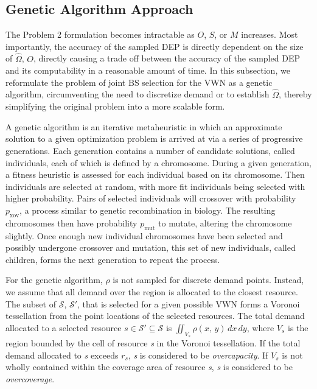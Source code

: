 \documentclass[conference]{IEEEtran}
\begin{document}
\subsection{Genetic Algorithm Approach} \label{subsec:ga}
The Problem 2 formulation becomes intractable as $O$, $S$, or $M$ increases.  Most importantly, the accuracy of the sampled DEP is directly dependent on the size of $\hat{\Omega}$, $O$, directly causing a trade off between the accuracy of the sampled DEP and its computability in a reasonable amount of time.  In this subsection, we reformulate the problem of joint BS selection for the VWN as a genetic algorithm, circumventing the need to discretize demand or to establish $\hat{\Omega}$, thereby simplifying the original problem into a more scalable form.

A genetic algorithm is an iterative metaheuristic in which an approximate solution to a given optimization problem is arrived at via a series of progressive generations.  Each generation contains a number of candidate solutions, called individuals, each of which is defined by a chromosome.  During a given generation, a fitness heuristic is assessed for each individual based on its chromosome.  Then individuals are selected at random, with more fit individuals being selected with higher probability.  Pairs of selected individuals will crossover with probability $p_\text{xov}$, a process similar to genetic recombination in biology.  The resulting chromosomes then have probability $p_\text{mut}$ to mutate, altering the chromosome slightly.  Once enough new individual chromosomes have been selected and possibly undergone crossover and mutation, this set of new individuals, called children, forms the next generation to repeat the process.  %

For the genetic algorithm, $\rho$ is not sampled for discrete demand points.  Instead, we assume that all demand over the region is allocated to the closest resource.  The subset of $\mathcal{S}$, $\mathcal{S}'$, that is selected for a given possible VWN forms a Voronoi tessellation from the point locations of the selected resources.  The total demand allocated to a selected resource $s \in \mathcal{S}' \subseteq \mathcal{S}$ is $\iint_{V_s} \rho\left(x,\, y\right) \,dx \,dy$, where $V_s$ is the region bounded by the cell of resource \textit{s} in the Voronoi tessellation.  If the total demand allocated to \textit{s} exceeds $r_s$, \textit{s} is considered to be \textit{overcapacity}.  If $V_s$ is not wholly contained within the coverage area of resource \textit{s}, \textit{s} is considered to be \textit{overcoverage}.
\end{document}
